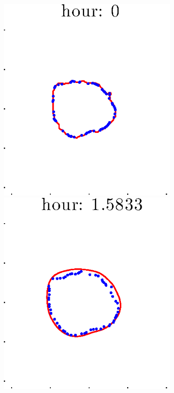 \documentclass[12pt]{article}
\begin{document}
\begin{figure}[h!]
\centering
	\begin{subfigure}[b]{.3\textwidth}
	\centering
		\includegraphics[height=.15\textheight]{Pos5exp2/full/full1.eps}
		\includegraphics[height=.15\textheight]{Pos5exp2/full/full2.eps}

\end{subfigure}
\end{figure}
\end{document}
